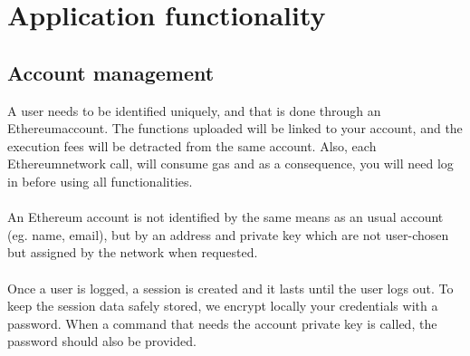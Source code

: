 \section{Application functionality}
\subsection{Account management}
A user needs to be identified uniquely, and that is done through an Ethereum\glo account. The functions uploaded will be linked to your account, and the execution fees will be detracted from the same account. Also, each Ethereum\glo network call, will consume gas and as a consequence, you will need log in before using all functionalities.\\\\An Ethereum account is not identified by the same means as an usual account (eg. name, email), but by an address and private key which are not user-chosen but assigned by the network when requested.
\\\\
Once a user is logged, a session is created and it lasts until the user logs out. To keep the session data safely stored, we encrypt locally your credentials with a password. When a command that needs the account private key is called, the password should also be provided.
